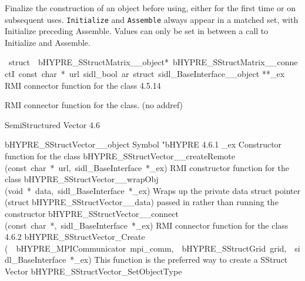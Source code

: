 \documentclass{article}
\begin{document}
\begin{cxxentry}
\begin{cxxentry}
\begin{cxxfunction}
\begin{cxxdoc}
Finalize the construction of an object before using, either
for the first time or on subsequent uses. {\tt Initialize}
and {\tt Assemble} always appear in a matched set, with
Initialize preceding Assemble. Values can only be set in
between a call to Initialize and Assemble.
\end{cxxdoc}
\end{cxxfunction}
\begin{cxxvariable}
{\ struct\ \ bHYPRE\_SStructMatrix\_\_object*\ bHYPRE\_SStructMatrix\_\_connectI\ const\ char\ *\ url\ sidl\_bool\ ar\ struct\ sidl\_BaseInterface\_\_object}
        {**\_ex}
        {}
        {
RMI connector function for the class}
        {4.5.14}
\begin{cxxdoc}

RMI connector function for the class. (no addref)
\end{cxxdoc}
\end{cxxvariable}
\end{cxxentry}
\begin{cxxentry}
{}
        {SemiStructured Vector}
        {}
        {
}
        {4.6}
\begin{cxxnames}
        {bHYPRE\_SStructVector\_\_object}
        {}
        {
Symbol "bHYPRE}
        {4.6.1}
        {\_ex}
        {}
        {
Constructor function for the class}
        {}
\label{cxx.4.6.16}
        {bHYPRE\_SStructVector\_\_createRemote}
        {(const\ char\ *\ url,\ sidl\_BaseInterface\ *\_ex)}
        {
RMI constructor function for the class}
        {}
\label{cxx.4.6.17}
        {bHYPRE\_SStructVector\_\_wrapObj}
        {(void\ *\ data,\ sidl\_BaseInterface\ *\_ex)}
        {
Wraps up the private data struct pointer (struct bHYPRE\_SStructVector\_\_data) passed in rather than running the constructor}
        {}
\label{cxx.4.6.18}
        {bHYPRE\_SStructVector\_\_connect}
        {(const\ char\ *,\ sidl\_BaseInterface\ *\_ex)}
        {
RMI connector function for the class}
        {4.6.2}
        {bHYPRE\_SStructVector\_Create}
        {(\ \ bHYPRE\_MPICommunicator\ mpi\_comm,\ \ bHYPRE\_SStructGrid\ grid,\ \ sidl\_BaseInterface\ *\_ex)}
        {
This function is the preferred way to create a SStruct Vector}
        {}
\label{cxx.4.6.19}
        {bHYPRE\_SStructVector\_SetObjectType}

\end{cxxnames}
\end{cxxentry}
\end{cxxentry}
\end{document}
